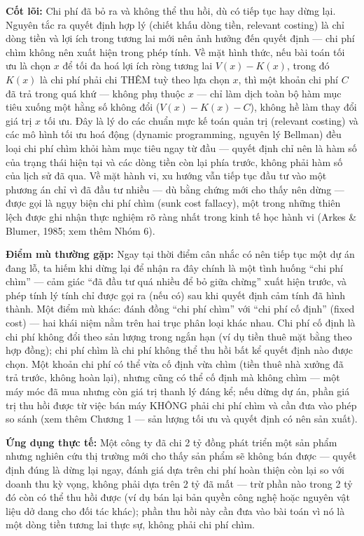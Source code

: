 \documentclass[
]{article}
\begin{document}
\textbf{Cốt lõi:} Chi phí đã bỏ ra và không thể thu hồi, dù có tiếp tục
hay dừng lại. Nguyên tắc ra quyết định hợp lý (chiết khấu dòng tiền,
relevant costing) là chỉ dòng tiền và lợi ích trong tương lai mới nên
ảnh hưởng đến quyết định --- chi phí chìm không nên xuất hiện trong phép
tính. Về mặt hình thức, nếu bài toán tối ưu là chọn \(x\) để tối đa hoá
lợi ích ròng tương lai \(V(x) - K(x)\), trong đó \(K(x)\) là chi phí
phải chi THÊM tuỳ theo lựa chọn \(x\), thì một khoản chi phí \(C\) đã
trả trong quá khứ --- không phụ thuộc \(x\) --- chỉ làm dịch toàn bộ hàm
mục tiêu xuống một hằng số không đổi (\(V(x) - K(x) - C\)), không hề làm
thay đổi giá trị \(x\) tối ưu. Đây là lý do các chuẩn mực kế toán quản
trị (relevant costing) và các mô hình tối ưu hoá động (dynamic
programming, nguyên lý Bellman) đều loại chi phí chìm khỏi hàm mục tiêu
ngay từ đầu --- quyết định chỉ nên là hàm số của trạng thái hiện tại và
các dòng tiền còn lại phía trước, không phải hàm số của lịch sử đã qua.
Về mặt hành vi, xu hướng vẫn tiếp tục đầu tư vào một phương án chỉ vì đã
đầu tư nhiều --- dù bằng chứng mới cho thấy nên dừng --- được gọi là
ngụy biện chi phí chìm (sunk cost fallacy), một trong những thiên lệch
được ghi nhận thực nghiệm rõ ràng nhất trong kinh tế học hành vi (Arkes
\& Blumer, 1985; xem thêm Nhóm 6).

\textbf{Điểm mù thường gặp:} Ngay tại thời điểm cân nhắc có nên tiếp tục
một dự án đang lỗ, ta hiếm khi dừng lại để nhận ra đây chính là một tình
huống ``chi phí chìm'' --- cảm giác ``đã đầu tư quá nhiều để bỏ giữa
chừng'' xuất hiện trước, và phép tính lý tính chỉ được gọi ra (nếu có)
sau khi quyết định cảm tính đã hình thành. Một điểm mù khác: đánh đồng
``chi phí chìm'' với ``chi phí cố định'' (fixed cost) --- hai khái niệm
nằm trên hai trục phân loại khác nhau. Chi phí cố định là chi phí không
đổi theo sản lượng trong ngắn hạn (ví dụ tiền thuê mặt bằng theo hợp
đồng); chi phí chìm là chi phí không thể thu hồi bất kể quyết định nào
được chọn. Một khoản chi phí có thể vừa cố định vừa chìm (tiền thuê nhà
xưởng đã trả trước, không hoàn lại), nhưng cũng có thể cố định mà không
chìm --- một máy móc đã mua nhưng còn giá trị thanh lý đáng kể; nếu dừng
dự án, phần giá trị thu hồi được từ việc bán máy KHÔNG phải chi phí chìm
và cần đưa vào phép so sánh (xem thêm Chương 1 --- sản lượng tối ưu và
quyết định có nên sản xuất).

\textbf{Ứng dụng thực tế:} Một công ty đã chi 2 tỷ đồng phát triển một
sản phẩm nhưng nghiên cứu thị trường mới cho thấy sản phẩm sẽ không bán
được --- quyết định đúng là dừng lại ngay, đánh giá dựa trên chi phí
hoàn thiện còn lại so với doanh thu kỳ vọng, không phải dựa trên 2 tỷ đã
mất --- trừ phần nào trong 2 tỷ đó còn có thể thu hồi được (ví dụ bán
lại bản quyền công nghệ hoặc nguyên vật liệu dở dang cho đối tác khác);
phần thu hồi này cần đưa vào bài toán vì nó là một dòng tiền tương lai
thực sự, không phải chi phí chìm.
\end{document}
